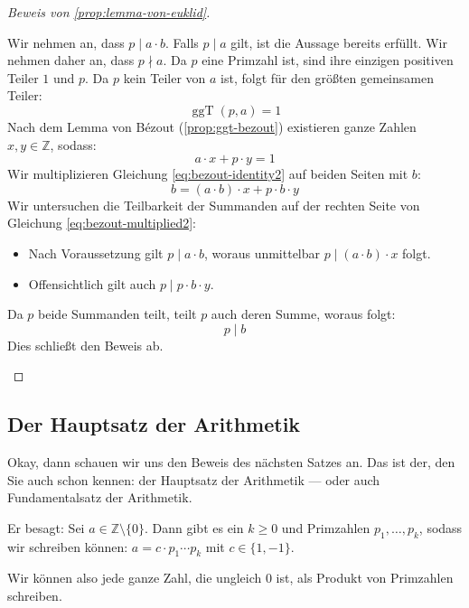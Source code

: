 \begin{proof}[Beweis von \cref{prop:lemma-von-euklid}]
\begin{math-stroke}
Wir nehmen an, dass $p \mid a \cdot b$. Falls $p \mid a$ gilt, ist die Aussage bereits erfüllt. Wir nehmen daher an, dass $p \nmid a$.
Da $p$ eine Primzahl ist, sind ihre einzigen positiven Teiler $1$ und $p$. Da $p$ kein Teiler von $a$ ist, folgt für den größten gemeinsamen Teiler:
\[ \operatorname{ggT}(p, a) = 1 \]
Nach dem Lemma von Bézout (\cref{prop:ggt-bezout}) existieren ganze Zahlen $x, y \in \mathbb{Z}$, sodass:
\begin{equation}\label{eq:bezout-identity2}
a \cdot x + p \cdot y = 1
\end{equation}
Wir multiplizieren Gleichung \eqref{eq:bezout-identity2} auf beiden Seiten mit $b$:
\begin{equation}\label{eq:bezout-multiplied2}
b = (a \cdot b) \cdot x + p \cdot b \cdot y
\end{equation}
Wir untersuchen die Teilbarkeit der Summanden auf der rechten Seite von Gleichung \eqref{eq:bezout-multiplied2}:
\begin{itemize}
    \item Nach Voraussetzung gilt $p \mid a \cdot b$, woraus unmittelbar $p \mid (a \cdot b) \cdot x$ folgt.
    \item Offensichtlich gilt auch $p \mid p \cdot b \cdot y$.
\end{itemize}
Da $p$ beide Summanden teilt, teilt $p$ auch deren Summe, woraus folgt:
\[ p \mid b \]
Dies schließt den Beweis ab.
\end{math-stroke}
\end{proof}

\subsection{Der Hauptsatz der Arithmetik}

\begin{spoken-clean}[00:46:03 - 00:47:29]
Okay, dann schauen wir uns den Beweis des nächsten Satzes an. Das ist der, den Sie auch schon kennen: der Hauptsatz der Arithmetik --- oder auch Fundamentalsatz der Arithmetik.

Er besagt: Sei $a \in \mathbb{Z} \setminus \{0\}$. Dann gibt es ein $k \ge 0$ und Primzahlen $p_1, \dots, p_k$, sodass wir schreiben können: $a = c \cdot p_1 \cdots p_k$ mit $c \in \{1, -1\}$.

Wir können also jede ganze Zahl, die ungleich $0$ ist, als Produkt von Primzahlen schreiben.
\end{spoken-clean}

